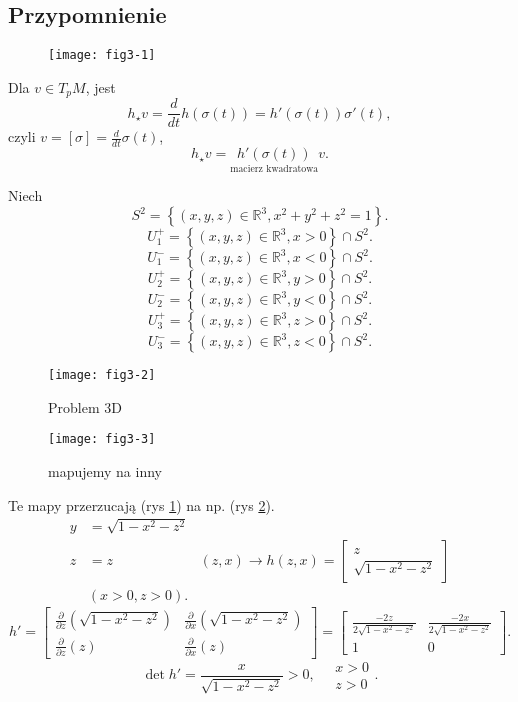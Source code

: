 \documentclass[../main.tex]{subfiles}
\begin{document}
    \subsection{Przypomnienie}
    \begin{figure}[h]
        \centering
        \texttt{[image: fig3-1]}
    \end{figure}
    Dla $v\in T_pM$, jest
    \[
        h_\star v = \frac{d}{dt}h(\sigma(t)) = h'(\sigma(t))\sigma'(t)
    ,\]
czyli $v = [\sigma] = \frac{d}{dt}\sigma(t)$,
\[
    h_\star v = \underset{\text{macierz kwadratowa}}{h'(\sigma(t))}v
.\]
\begin{przyklad}
    Niech
     \[
         S^2 = \left\{ (x,y,z)\in \mathbb{R}^3, x^2 + y^2 + z^2 = 1 \right\}
    .\]
\[
    U_1^+ = \left\{ (x,y,z)\in \mathbb{R}^3, x > 0 \right\} \cap S^2
.\]
\[
    U_1^- = \left\{ (x,y,z)\in \mathbb{R}^3, x < 0 \right\} \cap S^2
.\]
\[
    U_2^+ = \left\{ (x,y,z)\in \mathbb{R}^3, y > 0 \right\} \cap S^2
.\]
\[
    U_2^- = \left\{ (x,y,z)\in \mathbb{R}^3, y < 0 \right\} \cap S^2
.\]
\[
    U_3^+ = \left\{ (x,y,z)\in \mathbb{R}^3, z > 0 \right\} \cap S^2
.\]
\[
    U_3^- = \left\{ (x,y,z)\in \mathbb{R}^3, z < 0 \right\} \cap S^2
.\]
\begin{figure}[h]
    \centering
    \texttt{[image: fig3-2]}
    \caption{Problem 3D}
    \label{fig:fig3-2}
\end{figure}
\begin{figure}[h]
    \centering
    \texttt{[image: fig3-3]}
    \caption{mapujemy na inny}
    \label{fig:fig3-3}
\end{figure}
    Te mapy przerzucają (rys \ref{fig:fig3-2}) na np. (rys \ref{fig:fig3-3}).\\
\begin{align*}
    y &= \sqrt{1-x^2-z^2}\\
    z &= z &(z,x) \to h(z,x) = \begin{bmatrix} z\\ \sqrt{1 - x^2 - z^2} \end{bmatrix}\\
    &(x > 0, z > 0)
.\end{align*}
\[
    h' = \begin{bmatrix} \frac{\partial }{\partial z} \left( \sqrt{1-x^2-z^2}  \right) & \frac{\partial }{\partial x} \left( \sqrt{1-x^2-z^2}  \right) \\ \frac{\partial }{\partial z} \left( z \right) & \frac{\partial }{\partial x} (z) \end{bmatrix} = \begin{bmatrix} \frac{-2z}{2\sqrt{1-x^2-z^2} } & \frac{-2x}{2\sqrt{1-x^2-z^2} }\\ 1&0 \end{bmatrix}
.\]
\[
    \det h' = \frac{x}{\sqrt{1-x^2-z^2} } > 0,\quad \begin{matrix}x>0\\z>0\end{matrix}
.\]
\end{przyklad}
\end{document}
